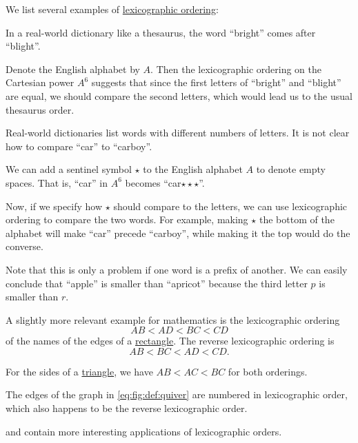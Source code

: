 \begin{example}\label{ex:def:lexicographic_order}
  We list several examples of \hyperref[def:lexicographic_order]{lexicographic ordering}:
  \begin{thmenum}
     In a real-world dictionary like a thesaurus, the word \enquote{bright} comes after \enquote{blight}.

    Denote the English alphabet by \( A \). Then the lexicographic ordering on the Cartesian power \( A^6 \) suggests that since the first letters of \enquote{bright} and \enquote{blight} are equal, we should compare the second letters, which would lead us to the usual thesaurus order.

     Real-world dictionaries list words with different numbers of letters. It is not clear how to compare \enquote{car} to \enquote{carboy}.

    We can add a sentinel symbol \( \star \) to the English alphabet \( A \) to denote empty spaces. That is, \enquote{car} in \( A^6 \) becomes \enquote{car\( \star \star \star \)}.

    Now, if we specify how \( \star \) should compare to the letters, we can use lexicographic ordering to compare the two words. For example, making \( \star \) the bottom of the alphabet will make \enquote{car} precede \enquote{carboy}, while making it the top would do the converse.

    Note that this is only a problem if one word is a prefix of another. We can easily conclude that \enquote{apple} is smaller than \enquote{apricot} because the third letter \( p \) is smaller than \( r \).

     A slightly more relevant example for mathematics is the lexicographic ordering
    \begin{equation*}
      AB < AD < BC < CD
    \end{equation*}
    of the names of the edges of a \hyperref[def:parallelogram/rectangle]{rectangle}. The reverse lexicographic ordering is
    \begin{equation*}
      AB < BC < AD < CD.
    \end{equation*}

     For the sides of a \hyperref[def:triangle]{triangle}, we have \( AB < AC < BC \) for both orderings.

     The edges of the graph in \eqref{eq:fig:def:quiver} are numbered in lexicographic order, which also happens to be the reverse lexicographic order.

      and  contain more interesting applications of lexicographic orders.
  \end{thmenum}
\end{example}


